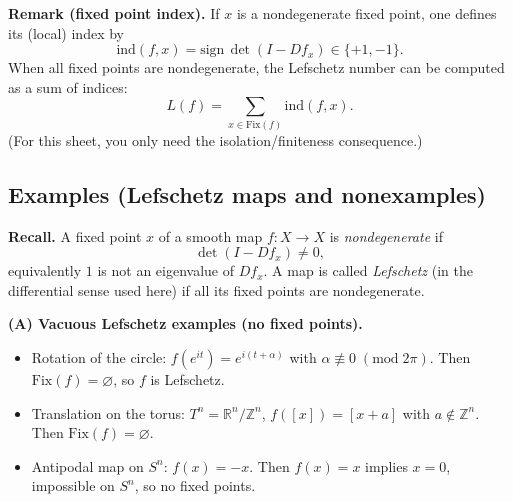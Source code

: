 \documentclass[12pt,a4paper]{article}
\theoremstyle{plain}
\theoremstyle{definition}      %
\begin{document}
\medskip
\noindent\textbf{Remark (fixed point index).}
If $x$ is a nondegenerate fixed point, one defines its (local) index by
\[
\mathrm{ind}(f,x)=\mathrm{sign}\,\det(I-Df_x)\in\{+1,-1\}.
\]
When all fixed points are nondegenerate, the Lefschetz number can be computed as a sum of indices:
\[
L(f)=\sum_{x\in \mathrm{Fix}(f)} \mathrm{ind}(f,x).
\]
(For this sheet, you only need the isolation/fin\-ite\-ness consequence.)

\subsection*{Examples (Lefschetz maps and nonexamples)}

\noindent\textbf{Recall.}
A fixed point $x$ of a smooth map $f:X\to X$ is \emph{nondegenerate} if
\[
\det(I-Df_x)\neq 0,
\]
equivalently $1$ is not an eigenvalue of $Df_x$.
A map is called \emph{Lefschetz} (in the differential sense used here) if all its fixed points are nondegenerate.

\medskip
\noindent\textbf{(A) Vacuous Lefschetz examples (no fixed points).}
\begin{itemize}
	\item Rotation of the circle: $f(e^{it})=e^{i(t+\alpha)}$ with $\alpha\not\equiv 0\;(\mathrm{mod}\;2\pi)$.
	Then $\mathrm{Fix}(f)=\varnothing$, so $f$ is Lefschetz.
	\item Translation on the torus: $T^n=\mathbb{R}^n/\mathbb{Z}^n$, $f([x])=[x+a]$ with $a\notin\mathbb{Z}^n$.
	Then $\mathrm{Fix}(f)=\varnothing$.
	\item Antipodal map on $S^n$: $f(x)=-x$. Then $f(x)=x$ implies $x=0$, impossible on $S^n$, so no fixed points.
\end{itemize}
\end{document}
